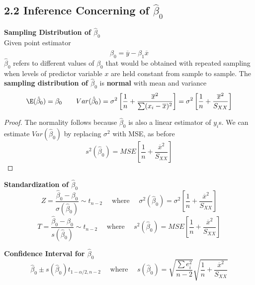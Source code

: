 \documentclass[11pt]{article}
\begin{document}
\subsection*{2.2 Inference Concerning of $\hat{\beta}_0$}

\begin{defn*}
    \textbf{Sampling Distribution of $\hat{\beta}_0$} \\
    Given point estimator 
    \[
        \hat{\beta}_0 = \overline{y} - \beta_1 \overline{x}
    \]
    $\hat{\beta}_0$ refers to different values of $\beta_0$ that would be obtained with repeated sampling when levels of predictor variable $x$ are held constant from sample to sample. The \textbf{sampling distribution of $\hat{\beta}_0$} is \textbf{normal} with mean and variance
    \[
        \E(\hat{\beta}_0) = \beta_0 \quad \quad Var(\hat{\beta}_0) = \sigma^2 \left[ \frac{1}{n} + \frac{\overline{x}^2}{\sum (x_i - \overline{x})^2} \right] = \sigma^2 \left[ \frac{1}{n} + \frac{\overline{x}^2}{S_{XX}} \right]
    \]
    \begin{proof}
        The normality follows because $\hat{\beta}_0$ is also a linear estimator of $y_i$s. We can estimate $Var(\hat{\beta}_0)$ by replacing $\sigma^2$ with MSE, as before
        \[
            s^2(\hat{\beta}_0) = MSE \left[ \frac{1}{n} + \frac{\overline{x}^2}{S_{XX}} \right]
        \] 
    \end{proof}
\end{defn*}

\begin{defn*}
    \textbf{Standardization of $\hat{\beta}_0$} \\
    
    \[
        Z = \frac{\hat{\beta}_0 - \beta_0}{\sigma(\hat{\beta}_0)} \sim t_{n-2} \quad \text{ where }\quad \sigma^2(\hat{\beta}_0) =  \sigma^2 \left[ \frac{1}{n} + \frac{\overline{x}^2}{S_{XX}} \right]
    \]
    \[
        T = \frac{\hat{\beta}_0 - \beta_0}{s(\hat{\beta}_0)} \sim t_{n-2} \quad \text{ where } \quad s^2(\hat{\beta}_0) = MSE \left[ \frac{1}{n} + \frac{\overline{x}^2}{S_{XX}} \right]
    \]
\end{defn*}

\begin{defn*}
    \textbf{Confidence Interval for $\hat{\beta}_0$}\\
    \[
        \hat{\beta}_0 \pm s(\hat{\beta}_0) t_{1-\alpha/2, n-2} \quad \text{ where } \quad s(\hat{\beta}_0) = \sqrt{\frac{\sum e_i^2}{n-2}} \sqrt{\frac{1}{n} + \frac{\overline{x}^2}{S_{XX}}}
    \]
\end{defn*}
\end{document}
